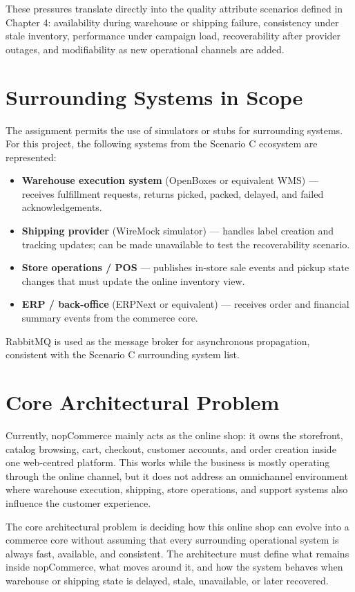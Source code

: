These pressures translate directly into the quality attribute scenarios defined in Chapter 4:
availability during warehouse or shipping failure, consistency under stale inventory,
performance under campaign load, recoverability after provider outages, and modifiability as
new operational channels are added.

\section{Surrounding Systems in Scope}

The assignment permits the use of simulators or stubs for surrounding systems. For this
project, the following systems from the Scenario C ecosystem are represented:

\begin{itemize}
    \item \textbf{Warehouse execution system} (OpenBoxes or equivalent WMS) --- receives
    fulfillment requests, returns picked, packed, delayed, and failed acknowledgements.
    \item \textbf{Shipping provider} (WireMock simulator) --- handles label creation and
    tracking updates; can be made unavailable to test the recoverability scenario.
    \item \textbf{Store operations / POS} --- publishes in-store sale events and pickup state
    changes that must update the online inventory view.
    \item \textbf{ERP / back-office} (ERPNext or equivalent) --- receives order and financial
    summary events from the commerce core.
\end{itemize}

RabbitMQ is used as the message broker for asynchronous propagation, consistent with the
Scenario C surrounding system list.

\section{Core Architectural Problem}

Currently, nopCommerce mainly acts as the online shop: it owns the storefront, catalog
browsing, cart, checkout, customer accounts, and order creation inside one web-centred
platform. This works while the business is mostly operating through the online channel, but it
does not address an omnichannel environment where warehouse execution, shipping, store
operations, and support systems also influence the customer experience.

The core architectural problem is deciding how this online shop can evolve into a commerce
core without assuming that every surrounding operational system is always fast, available, and
consistent. The architecture must define what remains inside nopCommerce, what moves around
it, and how the system behaves when warehouse or shipping state is delayed, stale, unavailable,
or later recovered.
